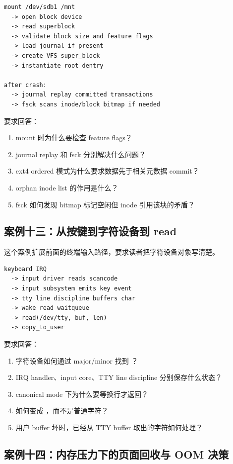 \begin{lstlisting}
mount /dev/sdb1 /mnt
  -> open block device
  -> read superblock
  -> validate block size and feature flags
  -> load journal if present
  -> create VFS super_block
  -> instantiate root dentry

after crash:
  -> journal replay committed transactions
  -> fsck scans inode/block bitmap if needed
\end{lstlisting}

要求回答：

\begin{enumerate}
\tightlist
\item mount 时为什么要检查 feature flags？
\item journal replay 和 fsck 分别解决什么问题？
\item ext4 ordered 模式为什么要求数据先于相关元数据 commit？
\item orphan inode list 的作用是什么？
\item fsck 如何发现 bitmap 标记空闲但 inode 引用该块的矛盾？
\end{enumerate}

\subsection{案例十三：从按键到字符设备到 read}

这个案例扩展前面的终端输入路径，要求读者把字符设备对象写清楚。

\begin{lstlisting}
keyboard IRQ
  -> input driver reads scancode
  -> input subsystem emits key event
  -> tty line discipline buffers char
  -> wake read waitqueue
  -> read(/dev/tty, buf, len)
  -> copy_to_user
\end{lstlisting}

要求回答：

\begin{enumerate}
\tightlist
\item 字符设备如何通过 major/minor 找到 ？
\item IRQ handler、input core、TTY line discipline 分别保存什么状态？
\item canonical mode 下为什么要等换行才返回？
\item {} 如何变成 ，而不是普通字符？
\item 用户 buffer 坏时，已经从 TTY buffer 取出的字符如何处理？
\end{enumerate}

\subsection{案例十四：内存压力下的页面回收与 OOM 决策}

